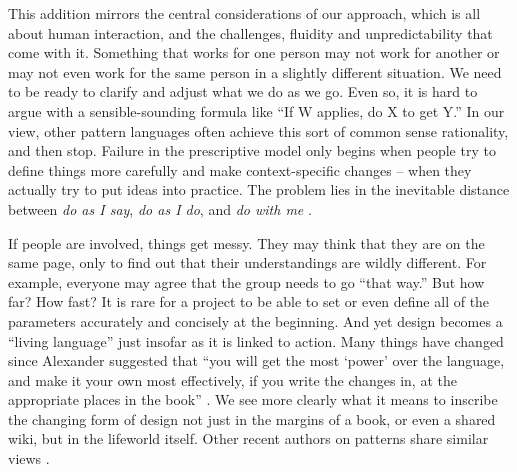 
This addition mirrors the central considerations of our approach, which is all about human interaction, and the challenges, fluidity and unpredictability that come with it.  Something that works for one person may not work for another or may not even work for the same person in a slightly different situation.  We need to be ready to clarify and adjust what we do as we go.   Even so, it is hard to argue with a sensible-sounding formula like ``If W applies, do X to get Y.'' In our view, other pattern languages often achieve this sort of common sense rationality, and then stop.  Failure in the prescriptive model only begins when people try to define things more carefully and make context-specific changes -- when they actually try to put ideas into practice.  The problem lies in the inevitable distance between \emph{do as I say}, \emph{do as I do}, and \emph{do with me} \cite[p.~26]{deleuze1994difference}.

If people are involved, things get messy.   They may think that they are on the same page, only to find out that their understandings are wildly different.  For  example, everyone may agree that the group needs to go ``that way.''  But how far?  How fast?  It is rare for a project to be able to set or even define all of the parameters accurately and concisely at the beginning.
And yet design becomes a ``living language'' \cite[p.~xvii]{alexander1977pattern}  just insofar as it is linked to action.  Many things have changed since Alexander suggested that ``you will get the most `power' over the language, and make it your own most effectively, if you write the changes in, at the appropriate places in the book'' \cite[p.~xl]{alexander1977pattern}.  We see more clearly what it means to inscribe the changing form of design not just in the margins of a book, or even a shared wiki, but in the lifeworld itself.  Other recent authors on patterns share similar views \cite{reiners2012approach, schummer2014beyond,plast-project}.


